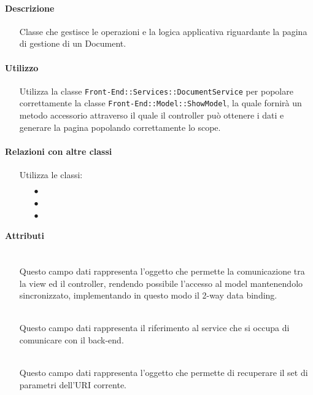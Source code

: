 \paragraph*{Descrizione}
\begin{itemize}
\item[] Classe che gestisce le operazioni e la logica applicativa riguardante la pagina di gestione di un Document.
\end{itemize}

\paragraph*{Utilizzo}
\begin{itemize}
\item[] Utilizza la classe \texttt{Front-End::Services::DocumentService} per popolare correttamente la classe \texttt{Front-End::Model::ShowModel}, la quale fornirà un metodo accessorio attraverso il quale il controller può ottenere i dati e generare la pagina popolando correttamente lo scope.
\end{itemize}

\paragraph*{Relazioni con altre classi}
\begin{itemize}


\item[] Utilizza le classi:
\begin{itemize}
\item[$\bullet$] 
\item[$\bullet$] 
\item[$\bullet$] 
\end{itemize}
\end{itemize}

\paragraph*{Attributi}
\begin{itemize}
\item[]  \\ Questo campo dati rappresenta l'oggetto che permette la comunicazione tra la view ed il controller, rendendo possibile l’accesso al model mantenendolo sincronizzato, implementando in questo modo il 2-way data binding.
\item[]  \\ Questo campo dati rappresenta il riferimento al service che si occupa di comunicare con il back-end.
\item[]  \\ Questo campo dati rappresenta l'oggetto che permette di recuperare il set di parametri dell'URI corrente.
\end{itemize}

